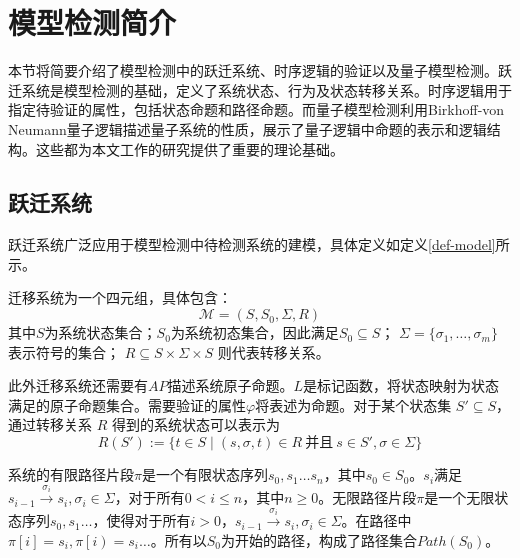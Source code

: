 \section{模型检测简介}
本节将简要介绍了模型检测中的跃迁系统、时序逻辑的验证以及量子模型检测。跃迁系统是模型检测的基础，定义了系统状态、行为及状态转移关系。时序逻辑用于指定待验证的属性，包括状态命题和路径命题。而量子模型检测利用Birkhoff-von Neumann量子逻辑描述量子系统的性质，展示了量子逻辑中命题的表示和逻辑结构。这些都为本文工作的研究提供了重要的理论基础。
\subsection{跃迁系统}
\label{sec-transition}
跃迁系统广泛应用于模型检测中待检测系统的建模，具体定义如定义\ref{def-model}所示。
\begin{definition}\citep{baier2008principles}
    \label{def-model}
    迁移系统为一个四元组，具体包含：
    \begin{equation}
        \mathcal{M}=(S, S_0, \Sigma, R)
    \end{equation}
    其中\(S\)为系统状态集合；\(S_0\)为系统初态集合，因此满足\(S_0\subseteq S\)； $\Sigma=\{\sigma_1,\ldots,\sigma_m\}$ 表示符号的集合； $R \subseteq S \times \Sigma \times S$ 则代表转移关系。
\end{definition}

此外迁移系统还需要有\(AP\)描述系统原子命题。$L$是标记函数，将状态映射为状态满足的原子命题集合。需要验证的属性\(\varphi\)将表述为命题。对于某个状态集 $S' \subseteq S$，通过转移关系 $R$ 得到的系统状态可以表示为
\begin{equation}\label{eq:image}
R(S') := \{ t\in S \mid (s, \sigma, t) \in R\ \text{并且}\ s \in S', \sigma \in \Sigma\}
\end{equation}


系统的有限路径片段\(\pi\)是一个有限状态序列\(s_0,s_1\ldots s_n\)，其中\(s_0\in S_0\)。\(s_i\)满足\(s_{i-1}\overset{\sigma_i}{\rightarrow}s_i,\sigma_i\in \Sigma\)，对于所有\(0<i\leq n\)，其中\(n\geq 0 \)。无限路径片段\(\pi\)是一个无限状态序列\(s_0,s_1\ldots\)，使得对于所有\(i>0\)，\(s_{i-1} \overset{\sigma_i}{\rightarrow}  s_i,\sigma_i\in \Sigma\)。在路径中\(\pi\left[i\right]=s_i,\pi\left[i\right)=s_i\ldots\)。所有以\(S_0\)为开始的路径，构成了路径集合\(Path\left(S_0\right)\)。

